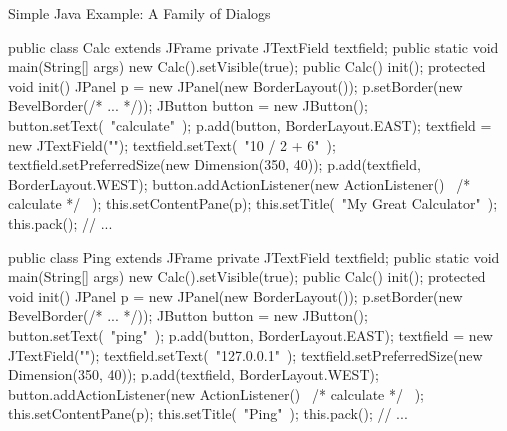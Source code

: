 \begin{frame}[fragile]{Simple Java Example: A Family of Dialogs}
	\vspace{-2mm}
	\begin{fancycolumns}[b]
\begin{codetight}{}
public class Calc extends JFrame {
	private JTextField textfield;
	public static void main(String[] args) {
		new Calc().setVisible(true);
	}
	public Calc() { init(); }
	protected void init() {
		JPanel p = new JPanel(new BorderLayout());
		p.setBorder(new BevelBorder(/* ... */));
		JButton button = new JButton();
		button.setText(~"calculate"~);
		p.add(button, BorderLayout.EAST);
		textfield = new JTextField("");
		textfield.setText(~"10 / 2 + 6"~);
		textfield.setPreferredSize(new Dimension(350, 40));
		p.add(textfield, BorderLayout.WEST);
		button.addActionListener(new ActionListener() 
			{ ~/* calculate */~ });
		this.setContentPane(p);
		this.setTitle(~"My Great Calculator"~);
		this.pack();
		// ...
	}
}
\end{codetight}
		\nextcolumn
\begin{codetight}{}
public class Ping extends JFrame {
	private JTextField textfield;
	public static void main(String[] args) {
		new Calc().setVisible(true);
	}
	public Calc() { init(); }
	protected void init() {
		JPanel p = new JPanel(new BorderLayout());
		p.setBorder(new BevelBorder(/* ... */));
		JButton button = new JButton();
		button.setText(~"ping"~);
		p.add(button, BorderLayout.EAST);
		textfield = new JTextField("");
		textfield.setText(~"127.0.0.1"~);
		textfield.setPreferredSize(new Dimension(350, 40));
		p.add(textfield, BorderLayout.WEST);
		button.addActionListener(new ActionListener() 
			{ ~/* calculate */~ });
		this.setContentPane(p);
		this.setTitle(~"Ping"~);
		this.pack();	
		// ...
	}
}
\end{codetight}
	\end{fancycolumns}
\end{frame}


